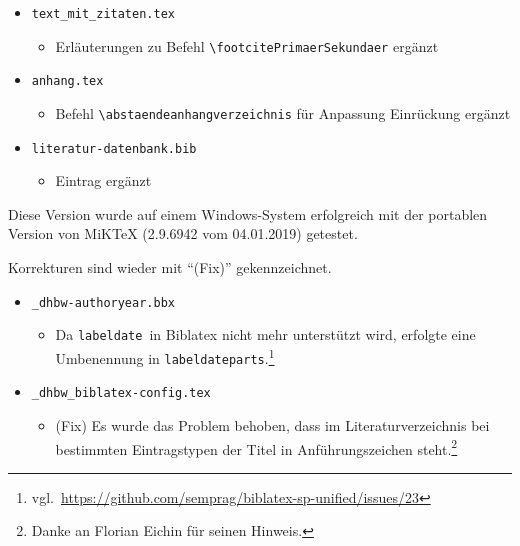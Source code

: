 \begin{itemize}
\item \verb|text_mit_zitaten.tex|
\begin{itemize}
\item Erläuterungen zu Befehl \verb|\footcitePrimaerSekundaer| ergänzt
\end{itemize}

\item \verb|anhang.tex|
\begin{itemize}
\item Befehl \verb|\abstaendeanhangverzeichnis| für Anpassung Einrückung ergänzt
\end{itemize}

\item \verb|literatur-datenbank.bib|
\begin{itemize}
\item Eintrag ergänzt
\end{itemize}

\end{itemize}

\label{anhang:ReleaseNotes17}
Diese Version wurde auf einem Windows-System erfolgreich mit der portablen Version von MiKTeX (2.9.6942 vom 04.01.2019) getestet.

Korrekturen sind wieder mit \enquote{(Fix)} gekennzeichnet.

\begin{itemize}
\item \verb|_dhbw-authoryear.bbx|
\begin{itemize}
\item Da \verb|labeldate| in Biblatex nicht mehr unterstützt wird, erfolgte eine Umbenennung in 
\verb|labeldateparts|.\footnote{vgl.\ \url{https://github.com/semprag/biblatex-sp-unified/issues/23}}
\end{itemize}

\item \verb|_dhbw_biblatex-config.tex|
\begin{itemize}
\item (Fix) Es wurde das Problem behoben, dass im Literaturverzeichnis bei bestimmten Eintragstypen der Titel in Anführungszeichen steht.\footnote{Danke an Florian Eichin für seinen Hinweis.}
\end{itemize}

\end{itemize}